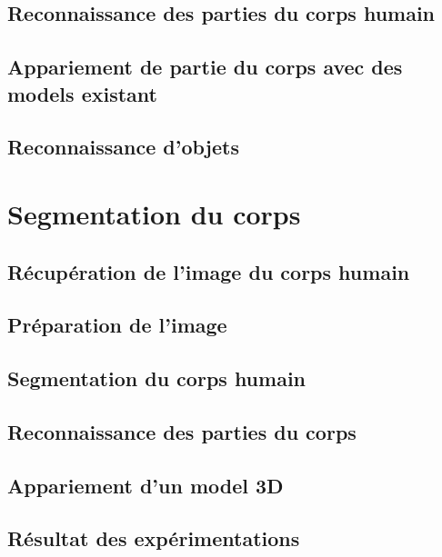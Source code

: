 \documentclass[a4paper,11pt]{article}
\begin{document}
\subsection{Reconnaissance des parties du corps humain}

\subsection{Appariement de partie du corps avec des models existant}

\subsection{Reconnaissance d'objets}

\section{Segmentation du corps}
\subsection{Récupération de l'image du corps humain}
\subsection{Préparation de l'image}
\subsection{Segmentation du corps humain}
\subsection{Reconnaissance des parties du corps}
\subsection{Appariement d'un model 3D}
\subsection{Résultat des expérimentations}
\end{document}
